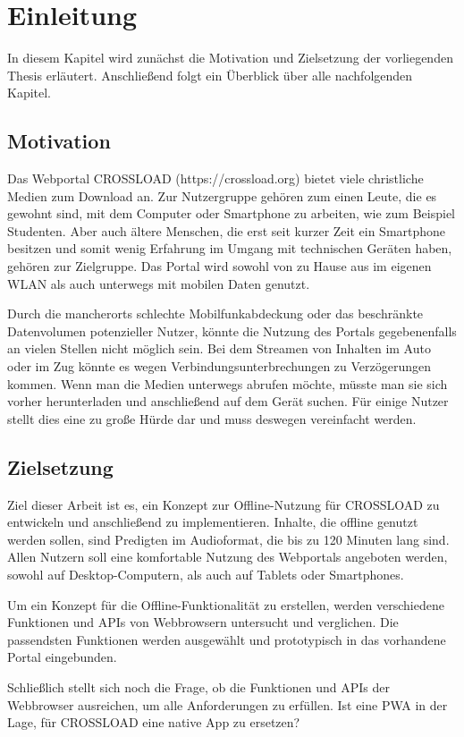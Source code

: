 \chapter{Einleitung}
\label{Kap1}
In diesem Kapitel wird zunächst die Motivation und Zielsetzung der vorliegenden Thesis erläutert. Anschließend folgt ein Überblick über alle nachfolgenden Kapitel.

\section{Motivation}
Das Webportal CROSSLOAD (https://crossload.org) bietet viele christliche Medien zum Download an. Zur Nutzergruppe gehören zum einen Leute, die es gewohnt sind, mit dem Computer oder Smartphone zu arbeiten, wie zum Beispiel Studenten. Aber auch ältere Menschen, die erst seit kurzer Zeit ein Smartphone besitzen und somit wenig Erfahrung im Umgang mit technischen Geräten haben, gehören zur Zielgruppe. Das Portal wird sowohl von zu Hause aus im eigenen WLAN als auch unterwegs mit mobilen Daten genutzt.

Durch die mancherorts schlechte Mobilfunkabdeckung oder das beschränkte Datenvolumen potenzieller Nutzer, könnte die Nutzung des Portals gegebenenfalls an vielen Stellen nicht möglich sein. Bei dem Streamen von Inhalten im Auto oder im Zug könnte es wegen Verbindungsunterbrechungen zu Verzögerungen kommen. Wenn man die Medien unterwegs abrufen möchte, müsste man sie sich vorher herunterladen und anschließend auf dem Gerät suchen. Für einige Nutzer stellt dies eine zu große Hürde dar und muss deswegen vereinfacht werden. 

\section{Zielsetzung}
Ziel dieser Arbeit ist es, ein Konzept zur Offline-Nutzung für CROSSLOAD zu entwickeln und anschließend zu implementieren. Inhalte, die offline genutzt werden sollen, sind Predigten im Audioformat, die bis zu 120 Minuten lang sind. Allen Nutzern soll eine komfortable Nutzung des Webportals angeboten werden, sowohl auf Desktop-Computern, als auch auf Tablets oder Smartphones. 

Um ein Konzept für die Offline-Funktionalität zu erstellen, werden verschiedene Funktionen und \acp{API} von Webbrowsern untersucht und verglichen. Die passendsten Funktionen werden ausgewählt und prototypisch in das vorhandene Portal eingebunden.

Schließlich stellt sich noch die Frage, ob die Funktionen und APIs der Webbrowser ausreichen, um alle Anforderungen zu erfüllen. Ist eine \ac{PWA} in der Lage, für CROSSLOAD eine native App zu ersetzen?

